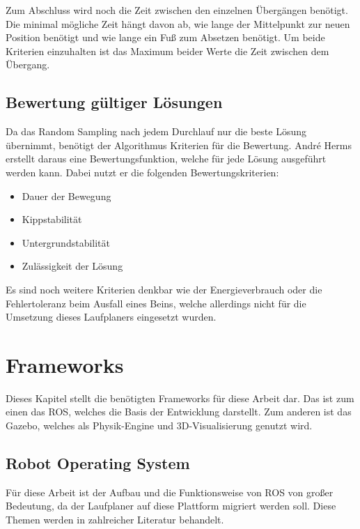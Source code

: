 Zum Abschluss wird noch die Zeit zwischen den einzelnen Übergängen benötigt. Die minimal mögliche Zeit hängt davon ab, wie lange der Mittelpunkt zur neuen Position benötigt und wie lange ein Fuß zum Absetzen benötigt. Um beide Kriterien einzuhalten ist das Maximum beider Werte die Zeit zwischen dem Übergang.

\subsection{Bewertung gültiger Lösungen}

Da das Random Sampling nach jedem Durchlauf nur die beste Lösung übernimmt, benötigt der Algorithmus Kriterien für die Bewertung. André Herms erstellt daraus eine Bewertungsfunktion, welche für jede Lösung ausgeführt werden kann. Dabei nutzt er die folgenden Bewertungskriterien:
\begin{itemize}
  \item Dauer der Bewegung
  \item Kippstabilität
  \item Untergrundstabilität
  \item Zulässigkeit der Lösung
\end{itemize}

Es sind noch weitere Kriterien denkbar wie der Energieverbrauch oder die Fehlertoleranz beim Ausfall eines Beins, welche allerdings nicht für die Umsetzung dieses Laufplaners eingesetzt wurden.

\section{Frameworks}

Dieses Kapitel stellt die benötigten Frameworks für diese Arbeit dar. Das ist zum einen das \ac{ROS}, welches die Basis der Entwicklung darstellt. Zum anderen ist das Gazebo, welches als Physik-Engine und 3D-Visualisierung genutzt wird.

\subsection{Robot Operating System}

Für diese Arbeit ist der Aufbau und die Funktionsweise von \ac{ROS} von großer Bedeutung, da der Laufplaner auf diese Plattform migriert werden soll. Diese Themen werden in zahlreicher Literatur behandelt. \autocite{rosAnOpenSourceRobotOperatingSystem} \autocite{learningROSForRoboticsProgramming} \autocite{gentleIntroductionToROS}

